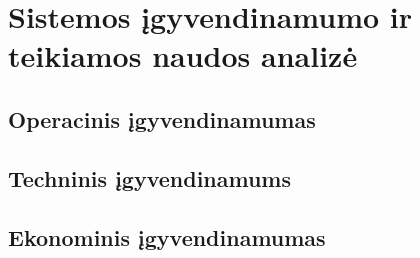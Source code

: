 \chapter{Sistemos įgyvendinamumo ir teikiamos naudos analizė}


\section{Operacinis įgyvendinamumas}


\section{Techninis įgyvendinamums}


\section{Ekonominis įgyvendinamumas}


